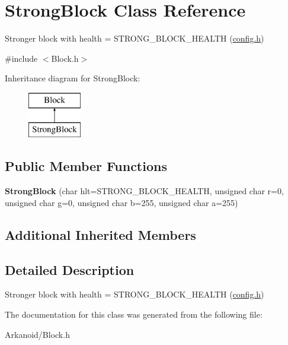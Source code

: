\hypertarget{class_strong_block}{}\section{Strong\+Block Class Reference}
\label{class_strong_block}


Stronger block with health = S\+T\+R\+O\+N\+G\+\_\+\+B\+L\+O\+C\+K\+\_\+\+H\+E\+A\+L\+TH (\hyperlink{_config_8h_source}{config.\+h})  




{\ttfamily \#include $<$Block.\+h$>$}

Inheritance diagram for Strong\+Block\+:\begin{figure}[H]
\begin{center}
\leavevmode
\includegraphics[height=2.000000cm]{class_strong_block}
\end{center}
\end{figure}
\subsection*{Public Member Functions}
\begin{DoxyCompactItemize}
\item 
\mbox{\label{class_strong_block_aeb0de776e3a9bb226f922e9f92832338}} 
{\bfseries Strong\+Block} (char hlt=S\+T\+R\+O\+N\+G\+\_\+\+B\+L\+O\+C\+K\+\_\+\+H\+E\+A\+L\+TH, unsigned char r=0, unsigned char g=0, unsigned char b=255, unsigned char a=255)
\end{DoxyCompactItemize}
\subsection*{Additional Inherited Members}


\subsection{Detailed Description}
Stronger block with health = S\+T\+R\+O\+N\+G\+\_\+\+B\+L\+O\+C\+K\+\_\+\+H\+E\+A\+L\+TH (\hyperlink{_config_8h_source}{config.\+h}) 

The documentation for this class was generated from the following file\+:\begin{DoxyCompactItemize}
\item 
Arkanoid/Block.\+h\end{DoxyCompactItemize}
